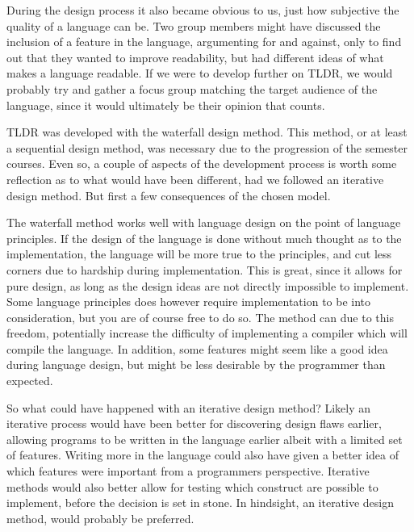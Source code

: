 During the design process it also became obvious to us, just how subjective the quality of a language can be. Two group members might have discussed the inclusion of a feature in the language, argumenting for and against, only to find out that they wanted to improve readability, but had different ideas of what makes a language readable. If we were to develop further on TLDR, we would probably try and gather a focus group matching the target audience of the language, since it would ultimately be their opinion that counts.

TLDR was developed with the waterfall design method. This method, or at least a sequential design method, was necessary due to the progression of the semester courses. Even so, a couple of aspects of the development process is worth some reflection as to what would have been different, had we followed an iterative design method. But first a few consequences of the chosen model.

The waterfall method works well with language design on the point of language principles. If the design of the language is done without much thought as to the implementation, the language will be more true to the principles, and cut less corners due to hardship during implementation. This is great, since it allows for pure design, as long as the design ideas are not directly impossible to implement. Some language principles does however require implementation to be into consideration, but you are of course free to do so. The method can due to this freedom, potentially increase the difficulty of implementing a compiler which will compile the language. In addition, some features might seem like a good idea during language design, but might be less desirable by the programmer than expected.

So what could have happened with an iterative design method? Likely an iterative process would have been better for discovering design flaws earlier, allowing programs to be written in the language earlier albeit with a limited set of features. Writing more in the language could also have given a better idea of which features were important from a programmers perspective. Iterative methods would also better allow for testing which construct are possible to implement, before the decision is set in stone. In hindsight, an iterative design method, would probably be preferred.
